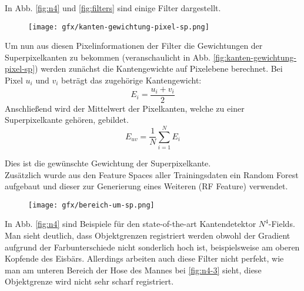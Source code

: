 In Abb. \ref{fig:n4} und \ref{fig:filters} sind einige Filter dargestellt. 

\newpage

\begin{figure}[H]
	\centering
	\texttt{[image: gfx/kanten-gewichtung-pixel-sp.png]}
\end{figure}
\label{fig:kanten-gewichtung-pixel-sp}
\vspace{0.5cm}

Um nun aus diesen Pixelinformationen der Filter die Gewichtungen der Superpixelkanten zu bekommen (veranschaulicht in Abb. \ref{fig:kanten-gewichtung-pixel-sp}) werden zunächst die Kantengewichte auf Pixelebene berechnet. Bei Pixel $u_i$ und $v_i$ beträgt das zugehörige Kantengewicht:
\begin{equation}
	E_{i}=\frac{u_i+v_i}{2}
\end{equation} 
Anschließend wird der Mittelwert der Pixelkanten, welche zu einer Superpixelkante gehören, gebildet. 
\begin{equation}
E_{uv} = \frac{1}{N} \sum\limits_{i=1}^{N} E_i
\end{equation}

Dies ist die gewünschte Gewichtung der Superpixelkante. \\


Zusätzlich wurde aus den Feature Spaces aller Trainingsdaten ein Random Forest aufgebaut und dieser zur Generierung eines Weiteren (RF Feature) verwendet.

\vspace{1cm}

\begin{figure}[H]
	\centering
	\texttt{[image: gfx/bereich-um-sp.png]}
\end{figure}
\label{fig:var-bereich-sp}
\vspace{0.5cm}

\newpage

In Abb. \ref{fig:n4} sind Beispiele für den state-of-the-art Kantendetektor $N^4$-Fields. Man sieht deutlich, dass Objektgrenzen registriert werden obwohl der Gradient aufgrund der Farbunterschiede nicht sonderlich hoch ist, beispielsweise am oberen Kopfende des Eisbärs. Allerdings arbeiten auch diese Filter nicht perfekt, wie man am unteren Bereich der Hose des Mannes bei \ref{fig:n4-3} sieht, diese Objektgrenze wird nicht sehr scharf registriert. 

